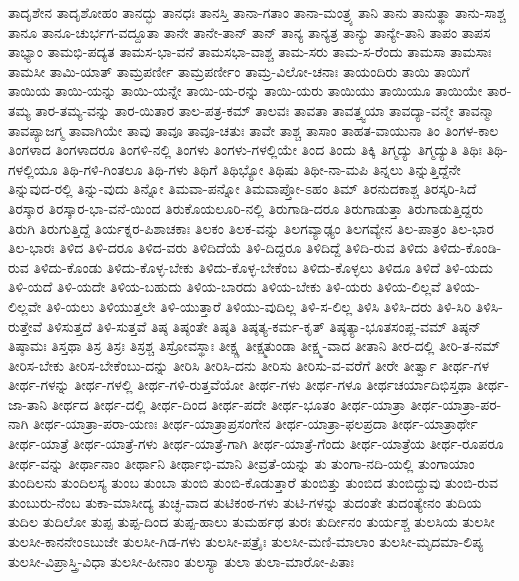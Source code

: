 {ತಾದೃಶೇನ
ತಾದೃಶೋಹಂ
ತಾನದ್ಭು
ತಾನಧಃ
ತಾನಸ್ತಿ
ತಾನಾ-ಗತಾಂ
ತಾನಾ-ಮಂತ್ರ್ಯ
ತಾನಿ
ತಾನು
ತಾನುತ್ಥಾ
ತಾನು-ಸಾಶ್ಚ
ತಾನೂ
ತಾನೂ-ಚುರ್ಭಗ-ವದ್ದೂತಾ
ತಾನೇ
ತಾನೇ-ತಾನ್
ತಾನ್
ತಾನ್ಯ
ತಾನ್ಯತ್ರ
ತಾನ್ಯು
ತಾನ್ಯೇ-ತಾನಿ
ತಾಪಂ
ತಾಪಸ
ತಾಭ್ಯಾಂ
ತಾಮಭಿ-ಪದ್ಯತ
ತಾಮಸ-ಭಾ-ವನೆ
ತಾಮಸಭಾ-ವಾಶ್ಚ
ತಾಮ-ಸರು
ತಾಮ-ಸ-ರೆಂದು
ತಾಮಸಾ
ತಾಮಸಾಃ
ತಾಮಸೀ
ತಾಮಿ-ಯಾತ್
ತಾಮ್ರಪರ್ಣೀ
ತಾಮ್ರಪರ್ಣೀಂ
ತಾಮ್ರ-ವಿಲೋ-ಚನಾಃ
ತಾಯಂದಿರು
ತಾಯಿ
ತಾಯಿಗೆ
ತಾಯಿಯ
ತಾಯಿ-ಯನ್ನು
ತಾಯಿ-ಯನ್ನೇ
ತಾಯಿ-ಯ-ರನ್ನು
ತಾಯಿ-ಯರು
ತಾಯಿಯು
ತಾಯಿಯೂ
ತಾಯಿಯೇ
ತಾರ-ತಮ್ಯ
ತಾರ-ತಮ್ಯ-ವನ್ನು
ತಾರ-ಯಿತಾರ
ತಾಲ-ಪತ್ರ-ಕಮ್
ತಾಲವಃ
ತಾವತಾ
ತಾವತ್ತ್ವಯಾ
ತಾವದ್ಯಾ-ವನ್ಮೇ
ತಾವನ್ಮಾ
ತಾವಪ್ಯಾಜಗ್ಮ
ತಾವಾಗಿಯೇ
ತಾವು
ತಾವೂ
ತಾವೂ-ಚತುಃ
ತಾವೇ
ತಾಶ್ಚ
ತಾಸಾಂ
ತಾಹತ-ವಾಯುನಾ
ತಿಂ
ತಿಂಗಳ-ಕಾಲ
ತಿಂಗಳಾದ
ತಿಂಗಳಾದರೂ
ತಿಂಗಳಿ-ನಲ್ಲಿ
ತಿಂಗಳು
ತಿಂಗಳು-ಗಳಲ್ಲಿಯೇ
ತಿಂದ
ತಿಂದು
ತಿಕ್ಕಿ
ತಿಗ್ಮದ್ಯು
ತಿಗ್ಮದ್ಯುತಿ
ತಿಥಿಃ
ತಿಥಿ-ಗಳಲ್ಲಿಯೂ
ತಿಥಿ-ಗಳಿ-ಗಿಂತಲೂ
ತಿಥಿ-ಗಳು
ತಿಥಿಗೆ
ತಿಥಿಭ್ಯೋ
ತಿಥಿಷು
ತಿಥೀ-ನಾ-ಮಪಿ
ತಿನ್ನಲು
ತಿನ್ನುತ್ತಿದ್ದೆನೇ
ತಿನ್ನುವುದ-ರಲ್ಲಿ
ತಿನ್ನು-ವುದು
ತಿನ್ನೋ
ತಿಮವಾ-ಪನ್ನೋ
ತಿಮವಾಪ್ತೋ-ಽಹಂ
ತಿಮ್
ತಿರನುದಕಾಶ್ಚ
ತಿರಸ್ಕರಿ-ಸಿದೆ
ತಿರಸ್ಕಾರ
ತಿರಸ್ಕಾರ-ಭಾ-ವನೆ-ಯಿಂದ
ತಿರುಕೊಯಲೂರಿ-ನಲ್ಲಿ
ತಿರುಗಾಡಿ-ದರೂ
ತಿರುಗಾಡುತ್ತಾ
ತಿರುಗಾಡುತ್ತಿದ್ದರು
ತಿರುಗಿ
ತಿರುಗುತ್ತಿದ್ದೆ
ತಿರ್ಯಕ್ನರ-ಪಿಶಾಚಕಾಃ
ತಿಲಕಂ
ತಿಲಕ-ವನ್ನು
ತಿಲಗವ್ಯಾಢ್ಯಂ
ತಿಲಗವ್ಯೇನ
ತಿಲ-ಪಾತ್ರಂ
ತಿಲ-ಭಾರ
ತಿಲ-ಭಾರಃ
ತಿಳಿದ
ತಿಳಿ-ದರೂ
ತಿಳಿದ-ವರು
ತಿಳಿದಿದೆಯೆ
ತಿಳಿ-ದಿದ್ದರೂ
ತಿಳಿದಿದ್ದೆ
ತಿಳಿದಿ-ರುವ
ತಿಳಿದು
ತಿಳಿದು-ಕೊಂಡಿ-ರುವ
ತಿಳಿದು-ಕೊಂಡು
ತಿಳಿದು-ಕೊಳ್ಳ-ಬೇಕು
ತಿಳಿದು-ಕೊಳ್ಳ-ಬೇಕೆಂಬ
ತಿಳಿದು-ಕೊಳ್ಳಲು
ತಿಳಿದೂ
ತಿಳಿದೆ
ತಿಳಿ-ಯದು
ತಿಳಿ-ಯದೆ
ತಿಳಿ-ಯದೇ
ತಿಳಿಯ-ಬಹುದು
ತಿಳಿಯ-ಬಾರದು
ತಿಳಿಯ-ಬೇಕು
ತಿಳಿ-ಯರು
ತಿಳಿಯ-ಲಿಲ್ಲವೆ
ತಿಳಿಯ-ಲಿಲ್ಲವೇ
ತಿಳಿ-ಯಲು
ತಿಳಿಯುತ್ತಲೇ
ತಿಳಿ-ಯುತ್ತಾರೆ
ತಿಳಿಯು-ವುದಿಲ್ಲ
ತಿಳಿ-ಸ-ಲಿಲ್ಲ
ತಿಳಿಸಿ
ತಿಳಿಸಿ-ದರು
ತಿಳಿ-ಸಿರಿ
ತಿಳಿಸಿ-ರುತ್ತೇವೆ
ತಿಳಿಸುತ್ತದೆ
ತಿಳಿ-ಸುತ್ತವೆ
ತಿಷ್ಠ
ತಿಷ್ಠಂತೇ
ತಿಷ್ಠತಿ
ತಿಷ್ಠತ್ಯ-ಕರ್ಮ-ಕೃತ್
ತಿಷ್ಠತ್ಯಾ-ಭೂತಸಂಪ್ಲ-ವಮ್
ತಿಷ್ಠನ್
ತಿಷ್ಠಾಮಃ
ತಿಸ್ತಥಾ
ತಿಸ್ರ
ತಿಸ್ರಃ
ತಿಸ್ರಶ್ಚ
ತಿಸ್ರೋವಸ್ಥಾಃ
ತೀಕ್ಷ್ಣ
ತೀಕ್ಷ್ಮತುಂಡಾ
ತೀಕ್ಷ್ಮ-ವಾದ
ತೀತಾನಿ
ತೀರ-ದಲ್ಲಿ
ತೀರಿ-ತ-ನಮ್
ತೀರಿಸ-ಬೇಕು
ತೀರಿಸ-ಬೇಕೆಂಬು-ದನ್ನು
ತೀರಿಸಿ
ತೀರಿಸಿ-ದನು
ತೀರಿಸು
ತೀರಿಸು-ವ-ವರೆಗೆ
ತೀರೇ
ತೀರ್ತ್ವಾ
ತೀರ್ಥ-ಗಳ
ತೀರ್ಥ-ಗಳನ್ನು
ತೀರ್ಥ-ಗಳಲ್ಲಿ
ತೀರ್ಥ-ಗಳಿ-ರುತ್ತವೆಯೋ
ತೀರ್ಥ-ಗಳು
ತೀರ್ಥ-ಗಳೂ
ತೀರ್ಥಚರ್ಯಾದಿಭಿಸ್ತಥಾ
ತೀರ್ಥ-ಜಾ-ತಾನಿ
ತೀರ್ಥದ
ತೀರ್ಥ-ದಲ್ಲಿ
ತೀರ್ಥ-ದಿಂದ
ತೀರ್ಥ-ಪದೇ
ತೀರ್ಥ-ಭೂತಂ
ತೀರ್ಥ-ಯಾತ್ರಾ
ತೀರ್ಥ-ಯಾತ್ರಾ-ಪರ-ನಾಗಿ
ತೀರ್ಥ-ಯಾತ್ರಾ-ಪರಾ-ಯಣಃ
ತೀರ್ಥ-ಯಾತ್ರಾಪ್ರಸಂಗೇನ
ತೀರ್ಥ-ಯಾತ್ರಾ-ಫಲಪ್ರದಾ
ತೀರ್ಥ-ಯಾತ್ರಾರ್ಥೇ
ತೀರ್ಥ-ಯಾತ್ರೆ
ತೀರ್ಥ-ಯಾತ್ರೆ-ಗಳು
ತೀರ್ಥ-ಯಾತ್ರೆ-ಗಾಗಿ
ತೀರ್ಥ-ಯಾತ್ರೆ-ಗೆಂದು
ತೀರ್ಥ-ಯಾತ್ರೆಯ
ತೀರ್ಥ-ರೂಪರೂ
ತೀರ್ಥ-ವನ್ನು
ತೀರ್ಥಾನಾಂ
ತೀರ್ಥಾನಿ
ತೀರ್ಥಾಭಿ-ಮಾನಿ
ತೀವ್ರತೆ-ಯನ್ನು
ತು
ತುಂಗಾ-ನದಿ-ಯಲ್ಲಿ
ತುಂಗಾಯಾಂ
ತುಂದಿಲನು
ತುಂದಿಲಸ್ಯ
ತುಂಬ
ತುಂಬಾ
ತುಂಬಿ
ತುಂಬಿ-ಕೊಡುತ್ತಾರೆ
ತುಂಬಿತ್ತು
ತುಂಬಿದ
ತುಂಬಿದ್ದುವು
ತುಂಬಿ-ರುವ
ತುಂಬುರು-ನೆಂಬ
ತುಕಾ-ಮಾಸೀದ್ಯ
ತುಚ್ಛ-ವಾದ
ತುಟಿಕಂಠ-ಗಳು
ತುಟಿ-ಗಳನ್ನು
ತುದಂತೇ
ತುದಂತ್ಯೇನಂ
ತುದಿಯ
ತುದಿಲ
ತುದಿಲೋ
ತುಪ್ಪ
ತುಪ್ಪ-ದಿಂದ
ತುಪ್ಪ-ಹಾಲು
ತುಮರ್ಹಥ
ತುರಃ
ತುರ್ದೀನಂ
ತುರ್ಯಶ್ಚ
ತುಲಸಿಯ
ತುಲಸೀ
ತುಲಸೀ-ಕಾನನೇಂಽಬುಜೇ
ತುಲಸೀ-ಗಿಡ-ಗಳು
ತುಲಸೀ-ಪತ್ರೈಃ
ತುಲಸೀ-ಮಣಿ-ಮಾಲಾಂ
ತುಲಸೀ-ಮೃದಮಾ-ಲಿಪ್ಯ
ತುಲಸೀ-ವಿಪ್ರಾಸ್ತ್ರಿ-ವಿಧಾ
ತುಲಸೀ-ಹೀನಾಂ
ತುಲಸ್ಯಾ
ತುಲಾ
ತುಲಾ-ಮಾರೋ-ಪಿತಾಃ
}
